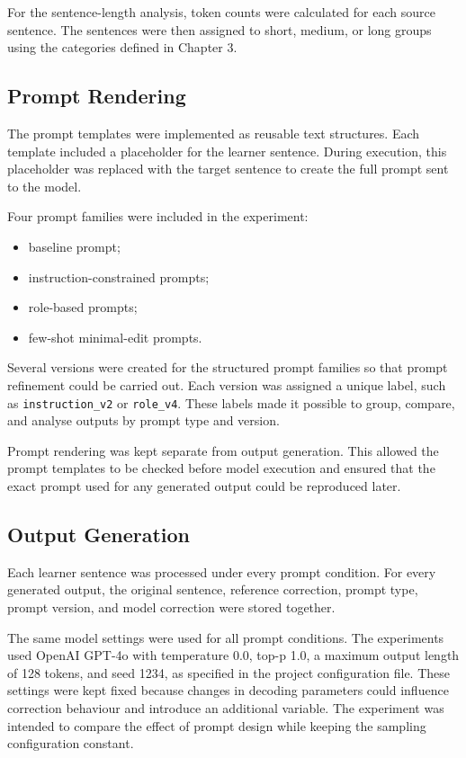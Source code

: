 For the sentence-length analysis, token counts were calculated for each source sentence. The sentences were then assigned to short, medium, or long groups using the categories defined in Chapter 3.

\subsection{Prompt Rendering}

The prompt templates were implemented as reusable text structures. Each template included a placeholder for the learner sentence. During execution, this placeholder was replaced with the target sentence to create the full prompt sent to the model.

Four prompt families were included in the experiment:

\begin{itemize}
    \item baseline prompt;
    \item instruction-constrained prompts;
    \item role-based prompts;
    \item few-shot minimal-edit prompts.
\end{itemize}

Several versions were created for the structured prompt families so that prompt refinement could be carried out. Each version was assigned a unique label, such as \texttt{instruction\_v2} or \texttt{role\_v4}. These labels made it possible to group, compare, and analyse outputs by prompt type and version.

Prompt rendering was kept separate from output generation. This allowed the prompt templates to be checked before model execution and ensured that the exact prompt used for any generated output could be reproduced later.

\subsection{Output Generation}

Each learner sentence was processed under every prompt condition. For every generated output, the original sentence, reference correction, prompt type, prompt version, and model correction were stored together.

The same model settings were used for all prompt conditions. The experiments used OpenAI GPT-4o with temperature 0.0, top-p 1.0, a maximum output length of 128 tokens, and seed 1234, as specified in the project configuration file. These settings were kept fixed because changes in decoding parameters could influence correction behaviour and introduce an additional variable. The experiment was intended to compare the effect of prompt design while keeping the sampling configuration constant.

